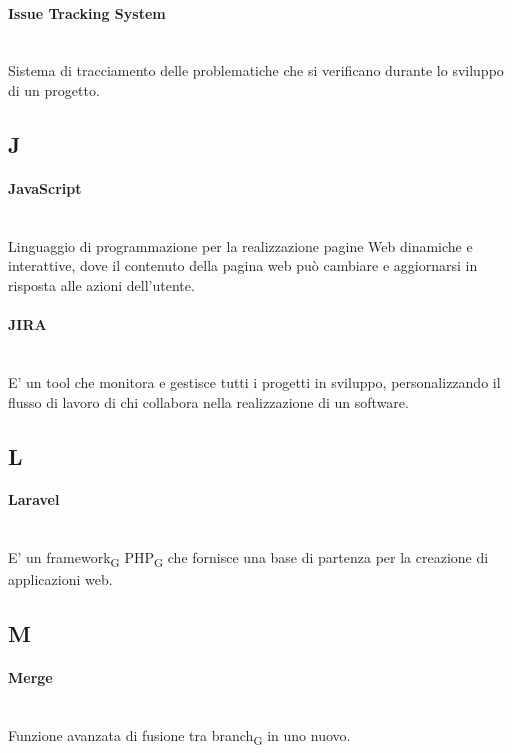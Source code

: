 \paragraph{Issue Tracking System}~\smallskip \\
Sistema di tracciamento delle problematiche che si verificano durante lo sviluppo di un progetto.
\newpage
{}
\subsection*{J}
\paragraph{JavaScript}~\smallskip \\
Linguaggio di programmazione per la realizzazione pagine Web dinamiche e interattive, dove il contenuto della pagina web può cambiare e aggiornarsi in risposta alle azioni dell'utente.

\paragraph{JIRA}~\smallskip \\
E' un tool che monitora e gestisce tutti i progetti in sviluppo, personalizzando il flusso di lavoro di chi collabora nella realizzazione di un software.

\newpage
{}
\subsection*{L}
\paragraph{Laravel}~\smallskip \\
E' un framework\textsubscript{G} PHP\textsubscript{G} che fornisce una base di partenza per la creazione di applicazioni web.

\newpage
{}
\subsection*{M}

\paragraph{Merge}~\smallskip \\
Funzione avanzata di fusione tra branch\textsubscript{G} in uno nuovo.

